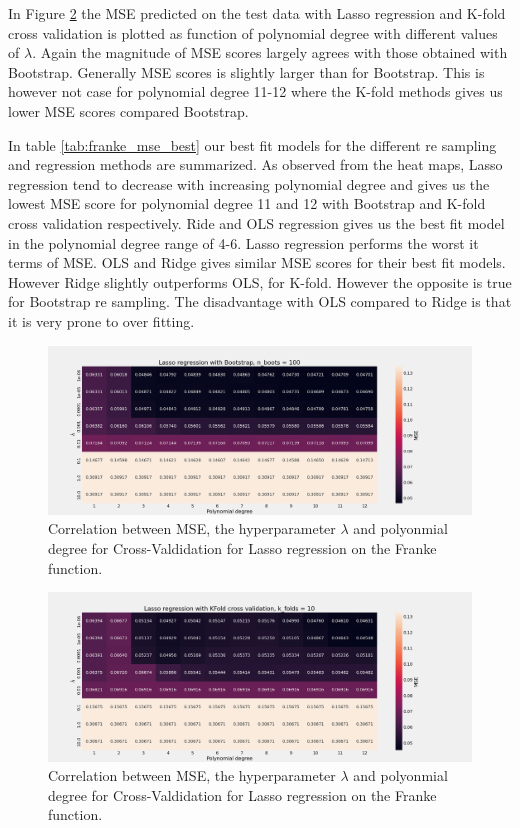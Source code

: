 In Figure \ref{fig:f_lasso_kflod} the MSE predicted on the test data with Lasso
regression and K-fold cross validation is plotted as function of polynomial
degree with different values of $\lambda $. Again the magnitude of MSE scores
largely agrees with those obtained with Bootstrap. Generally MSE scores is
slightly larger than for Bootstrap. This is however not case for polynomial
degree 11-12 where the K-fold methods gives us lower MSE scores compared
Bootstrap.  

In table \ref{tab:franke_mse_best} our best fit models for the different
re sampling and regression methods are summarized. As observed from the heat
maps, Lasso regression tend to decrease with increasing polynomial degree and
gives us the lowest MSE score for polynomial degree 11 and 12 with Bootstrap and
K-fold cross validation respectively. Ride and OLS regression gives us the best
fit model in the polynomial degree range of 4-6. Lasso regression performs the
worst it terms of MSE. OLS and Ridge gives similar MSE scores for their best
fit models. However Ridge slightly outperforms OLS, for K-fold. However the
opposite is true for Bootstrap re sampling. The disadvantage with OLS compared
to Ridge is that it is very prone to over fitting.  

\begin{figure}[H]
    \centering
    \includegraphics[width=\textwidth]{Figures/f_lasso_bootstrap_n_100.png}
    \caption{Correlation between MSE, the hyperparameter $\lambda$ and polyonmial degree for Cross-Valdidation for Lasso regression on the Franke function.}
    \label{fig:f_lasso_bootstrap}
\end{figure}


\begin{figure}[H]
    \centering
    \includegraphics[width=\textwidth]{Figures/f_lasso_kfold_n_10.png}
    \caption{Correlation between MSE, the hyperparameter $\lambda$ and polyonmial degree for Cross-Valdidation for Lasso regression on the Franke function.}
    \label{fig:f_lasso_kflod}
\end{figure}




